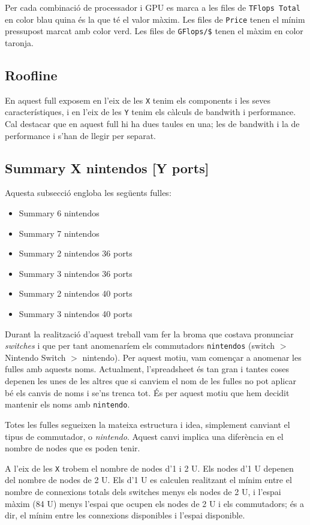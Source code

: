 Per cada combinació de processador i GPU es marca a les files de \texttt{TFlops Total} en color blau quina és la que té el valor màxim. Les files de \texttt{Price} tenen el mínim pressupost marcat amb color verd. Les files de \texttt{GFlops/\$} tenen el màxim en color taronja.


\subsection{Roofline}
En aquest full exposem en l'eix de les \texttt{X} tenim els components i les seves característiques, i en l'eix de les \texttt{Y} tenim els càlculs de bandwith i performance. Cal destacar que en aquest full hi ha dues taules en una; les de bandwith i la de performance i s'han de llegir per separat.

\subsection{Summary X nintendos [Y ports]} \label{sec:annex_summary}
Aquesta subsecció engloba les següents fulles:
\begin{itemize}
    \item Summary 6 nintendos
    \item Summary 7 nintendos
    \item Summary 2 nintendos 36 ports
    \item Summary 3 nintendos 36 ports
    \item Summary 2 nintendos 40 ports
    \item Summary 3 nintendos 40 ports
\end{itemize}

Durant la realització d'aquest treball vam fer la broma que costava pronunciar \textit{switches} i que per tant anomenaríem els commutadors \texttt{nintendos} (switch $>$ Nintendo Switch $>$ nintendo). Per aquest motiu, vam començar a anomenar les fulles amb aquests noms.
Actualment, l'spreadsheet és tan gran i tantes coses depenen les unes de les altres que si canviem el nom de les fulles no pot aplicar bé els canvis de noms i se'ns trenca tot. És per aquest motiu que hem decidit mantenir els noms amb \texttt{nintendo}.

Totes les fulles segueixen la mateixa estructura i idea, simplement canviant el tipus de commutador, o \textit{nintendo}. Aquest canvi implica una diferència en el nombre de nodes que es poden tenir.

A l'eix de les \texttt{X} trobem el nombre de nodes d'1 i 2 U. Els nodes d'1 U depenen del nombre de nodes de 2 U. Els d'1 U es calculen realitzant el mínim entre el nombre de connexions totals dels switches menys els nodes de 2 U, i l'espai màxim (84 U) menys l'espai que ocupen els nodes de 2 U i els commutadors; és a dir, el mínim entre les connexions disponibles i l'espai disponible. 

